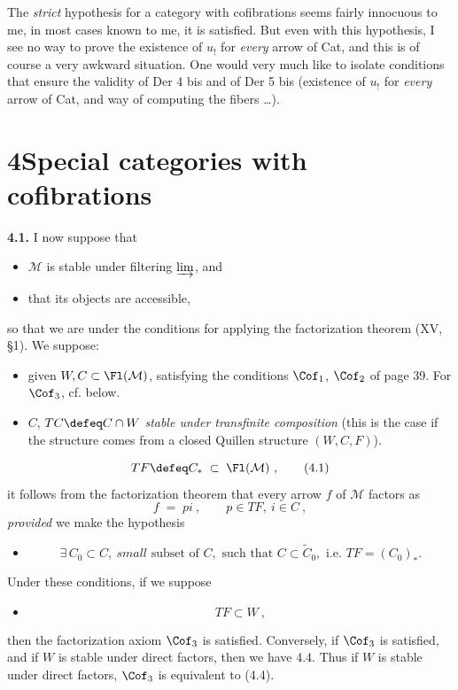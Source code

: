 The \textit{strict} hypothesis for a category with cofibrations seems fairly innocuous to me, in most cases known to me, it is satisfied. But even with this hypothesis, I see no way to prove the existence of $u_!$ for \textit{every} arrow of Cat, and this is of course a very awkward situation. One would very much like to isolate conditions that ensure the validity of Der 4 bis and of Der 5 bis (existence of $u_!$ for
\textit{every} arrow of Cat, and way of computing the fibers \dots).

\section*{4\quad Special categories with cofibrations}

\textbf{4.1.} I now suppose that
\begin{itemize}[leftmargin=3em]
\item[\circled{a}] $\mathcal{M}$ is stable under filtering $\varinjlim$, and
\item[\circled{b}] that its objects are accessible,
\end{itemize}
so that we are under the conditions for applying the factorization theorem (XV, \S1). We suppose:
\begin{itemize}[leftmargin=3em]
\item[\circled{c}] given $W, C \subset \Fl(\mathcal{M})$, satisfying the conditions $\Cof_1$, $\Cof_2$ of page 39. For $\Cof_3$, cf. below.
\item[\circled{d}] $C$, $TC \defeq C \cap W$ \textit{stable under transfinite composition} (this is the case if the structure comes from a closed Quillen structure $(W, C, F)$).
\end{itemize}
\[
TF \defeq C_* \;\subset\; \Fl(\mathcal{M})\ , \tag*{(4.1)}
\]
it follows from the factorization theorem that every arrow $f$ of $\mathcal{M}$ factors as
\[
f \;=\; pi\ , \qquad p \in TF,\ i \in C\ ,
\]
\textit{provided} we make the hypothesis
\begin{itemize}[leftmargin=3em]
\item[\circled{e}] \mbox{}
\[
\exists\, C_0 \subset C,\ \textit{small} \text{ subset of } C, \text{ such that } C \subset \tilde{C}_0, \text{ i.e. } TF = (C_0)_*. \tag*{(4.3)}
\]
\end{itemize}
Under these conditions, if we suppose
\begin{itemize}[leftmargin=3em]
\item[\circled{f}] \mbox{}
\[
TF \subset W\ , \tag*{(4.4)}
\]
\end{itemize}
then the factorization axiom $\Cof_3$ is satisfied. Conversely, if $\Cof_3$ is satisfied, and if $W$ is stable under direct factors, then we have 4.4. Thus if $W$ is stable under direct factors, $\Cof_3$ is equivalent to (4.4).

